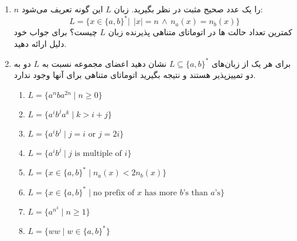 \documentclass{article}
\begin{document}
\begin{enumerate}
		
		\item 
		$n$
		را یک عدد صحیح مثبت در نظر بگیرید. زبان $L$ این گونه تعریف می‌شود:
		$$ L =\{ x \in \{ a,b \}^* | \;\, |x| = n \, \land \, n_a(x) = n_b(x)\}  $$
		کمترین تعداد حالت ها  در اتوماتای متناهی پذیرنده زبان $L$ چیست؟
		برای جواب خود دلیل ارائه دهید.
		 \\
		
		\item 
		برای هر یک از زبان‌های
		$L \subseteq \{a, b\}^*$
		نشان دهید اعضای مجموعه 
		نسبت به $L$ دو به دو تمییزپذیر
		هستند و نتیجه بگیرید اتوماتای متناهی 
		برای آنها وجود ندارد.
		\begin{latin}
			\begin{enumerate}
				\item $L = \{a^nba^{2n} \; | \; n \geq 0\}$
				\item $L = \{a^ib^ja^k \; | \; k >  i + j \}$
				\item $L = \{a^ib^j \; | \; \text{$j = i$ or $j = 2i$}\}$
				\item $L = \{a^ib^j \; | \; \text{$j$ is multiple of $i$}\}$
				\item $L = \{x \in \{a,b\}^* \; | \; n_a(x) < 2n_b(x) \}$
				\item $L = \{x \in \{a,b\}^* \; | \; \text{no prefix of $x$ has more $b$'s than $a$'s} \}$
				\item $L = \{a^{n^3} \; | \;  n \geq 1\}$
				\item $L = \{ww \; | \;  w \in \{a,b\}^*\}$
			\end{enumerate}
		\end{latin}
		
	\end{enumerate}
	
	
\end{document}
